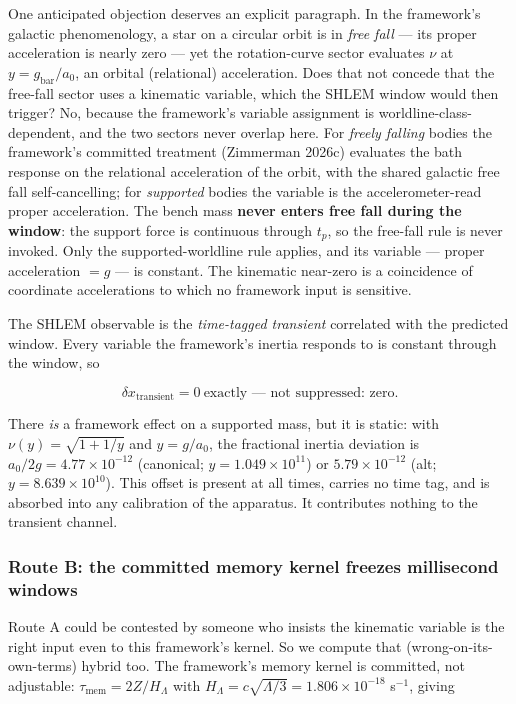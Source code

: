 \documentclass[
]{article}
\begin{document}
One anticipated objection deserves an explicit paragraph. In the
framework's galactic phenomenology, a star on a circular orbit is in
\emph{free fall} --- its proper acceleration is nearly zero --- yet the
rotation-curve sector evaluates \(\nu\) at \(y = g_\mathrm{bar}/a_0\), an
orbital (relational) acceleration. Does that not concede that the
free-fall sector uses a kinematic variable, which the SHLEM window would
then trigger? No, because the framework's variable assignment is
worldline-class-dependent, and the two sectors never overlap here. For
\emph{freely falling} bodies the framework's committed treatment
(Zimmerman 2026c) evaluates the bath response on the relational
acceleration of the orbit, with the shared galactic free fall
self-cancelling; for \emph{supported} bodies the variable is the
accelerometer-read proper acceleration. The bench mass \textbf{never
enters free fall during the window}: the support force is continuous
through \(t_p\), so the free-fall rule is never invoked. Only the
supported-worldline rule applies, and its variable --- proper
acceleration \(= g\) --- is constant. The kinematic near-zero is a
coincidence of coordinate accelerations to which no framework input is
sensitive.

The SHLEM observable is the \emph{time-tagged transient} correlated with
the predicted window. Every variable the framework's inertia responds to
is constant through the window, so

\[\boxed{\;\delta x_\mathrm{transient} = 0\ \text{exactly — not suppressed: zero.}\;}\]

There \emph{is} a framework effect on a supported mass, but it is
static: with \(\nu(y)=\sqrt{1+1/y}\) and \(y = g/a_0\), the fractional
inertia deviation is \(a_0/2g = 4.77\times10^{-12}\) (canonical;
\(y = 1.049\times10^{11}\)) or \(5.79\times10^{-12}\) (alt;
\(y = 8.639\times10^{10}\)). This offset is present at all times,
carries no time tag, and is absorbed into any calibration of the
apparatus. It contributes nothing to the transient channel.

\subsubsection{Route B: the committed memory kernel freezes millisecond
windows}\label{route-b-the-committed-memory-kernel-freezes-millisecond-windows}

Route A could be contested by someone who insists the kinematic variable
is the right input even to this framework's kernel. So we compute that
(wrong-on-its-own-terms) hybrid too. The framework's memory kernel is
committed, not adjustable: \(\tau_\mathrm{mem} = 2Z/H_\Lambda\) with
\(H_\Lambda = c\sqrt{\Lambda/3} = 1.806\times10^{-18}\) s\(^{-1}\),
giving
\end{document}
